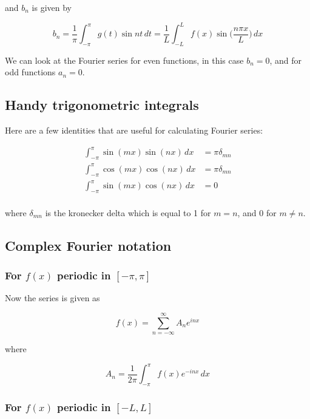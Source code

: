 \documentclass[a4paper]{article}
\begin{document}
and $b_n$ is given by

\begin{equation*}
    b_n=\frac{1}{\pi}\int_{-\pi}^{\pi}g(t)\sin nt\,dt=\frac{1}{L}\int_{-L}^{L}f(x)\sin\bigg(\frac{n\pi x}{L}\bigg)\,dx
\end{equation*}

We can look at the Fourier series for even functions, in this case $b_n=0$, and for odd functions $a_n=0$. 

\subsection{Handy trigonometric integrals}

Here are a few identities that are useful for calculating Fourier series:

\begin{align*}
    \int_{-\pi}^{\pi} \sin(mx)\sin(nx)\,dx &= \pi\delta_{mn} \\
    \int_{-\pi}^{\pi} \cos(mx)\cos(nx)\,dx &= \pi\delta_{mn} \\
    \int_{-\pi}^{\pi} \sin(mx)\cos(nx)\,dx &= 0 \\
\end{align*}

where $\delta_{mn}$ is the kronecker delta which is equal to 1 for $m=n$, and 0 for $m\not=n$.

\subsection{Complex Fourier notation}

\subsubsection*{For $f(x)$ periodic in $[-\pi,\pi]$}

Now the series is given as

\begin{equation*}
    f(x)=\sum_{n=-\infty}^{\infty} A_n e^{inx}
\end{equation*}

where

\begin{equation*}
    A_n=\frac{1}{2\pi}\int_{-\pi}^{\pi} f(x)e^{-inx}\,dx
\end{equation*}

\subsubsection*{For $f(x)$ periodic in $[-L,L]$}
\end{document}
